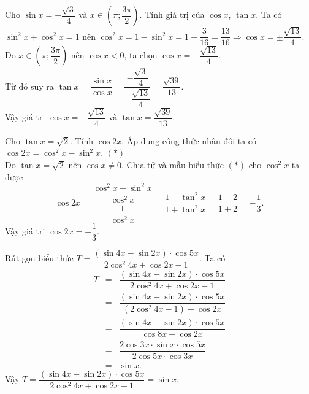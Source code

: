 

\begin{bt}%
	Cho $\sin x=-\dfrac{\sqrt{3}}{4}$ và $x \in\left(\pi ; \dfrac{3 \pi}{2}\right)$. Tính giá trị của $\cos x$, $\tan x$.
	\loigiai
	{Ta có $\sin^2x+\cos^2x=1$ nên $\cos^2x=1-\sin^2x=1-\dfrac{3}{16}=\dfrac{13}{16}\Rightarrow \cos x=\pm\dfrac{\sqrt{13}}{4}$.\\
		Do $x\in\left(\pi; \dfrac{3\pi}{2}\right)$ nên $\cos x<0$, ta chọn $\cos x=-\dfrac{\sqrt{13}}{4}$.\\
		Từ đó suy ra 
		$\tan x =\dfrac{\sin x }{\cos x}=\dfrac{-\dfrac{\sqrt{3}}{4}}{-\dfrac{\sqrt{13}}{4}}=\dfrac{\sqrt{39}}{13}$.\\
		Vậy giá trị  $\cos x= -\dfrac{\sqrt{13}}{4}$ và $\tan x=\dfrac{\sqrt{39}}{13}$.
	}
\end{bt}

\begin{bt}%
	Cho $\tan x=\sqrt{2}$. Tính $\cos 2x$.
	\loigiai
	{Áp dụng công thức nhân đôi ta có $\cos 2x=\cos^2x-\sin^2x$. \hfill $(*)$\\
		Do $\tan x=\sqrt{2}$ nên $\cos x\neq 0$. Chia tử và mẫu biểu thức $(*)$ cho $\cos^2x$ ta được
		\[ \cos 2x=\dfrac{\dfrac{\cos^2x-\sin^2x}{\cos^2x}}{\dfrac{1}{\cos^2 x}}=\dfrac{1-\tan^2x}{1+\tan^2 x}=\dfrac{1-2}{1+2}=-\dfrac{1}{3}.\]  
		Vậy giá trị $\cos 2x=-\dfrac{1}{3}$.
	}
\end{bt}

\begin{bt}%
	Rút gọn biểu thức $T=\dfrac{(\sin 4 x-\sin 2 x) \cdot \cos 5 x}{2 \cos ^2 4 x+\cos 2 x-1}$.
	\loigiai
	{Ta có
		\allowdisplaybreaks
		\begin{eqnarray*}
			T
			&=& \dfrac{(\sin 4 x-\sin 2 x) \cdot \cos 5 x}{2 \cos ^2 4 x+\cos 2 x-1} \\
			&=&\dfrac{(\sin 4 x-\sin 2 x) \cdot \cos 5 x}{(2\cos ^2 4 x-1)+\cos 2 x} \\
			&=& \dfrac{(\sin 4 x-\sin 2 x) \cdot \cos 5 x}{\cos 8x+\cos 2 x} \\
			&=&\dfrac{2\cos 3x\cdot \sin x\cdot \cos 5 x}{2\cos 5x\cdot \cos 3x} \\
			&=& \sin x.
		\end{eqnarray*}
		Vậy $T=\dfrac{(\sin 4 x-\sin 2 x) \cdot \cos 5 x}{2 \cos ^2 4 x+\cos 2 x-1}=\sin x$.
	}
\end{bt}

